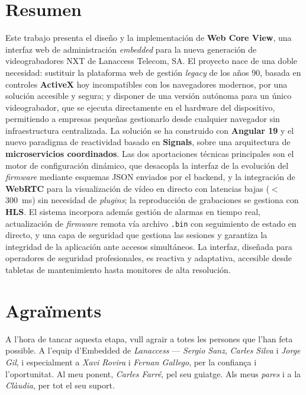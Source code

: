 \documentclass[12pt,a4paper,oneside]{report}
\begin{document}
\chapter*{Resumen}
Este trabajo presenta el diseño y la implementación de \textbf{Web Core View}, una interfaz web de administración \textit{embedded} para la nueva generación de videograbadores NXT de Lanaccess Telecom, SA. El proyecto nace de una doble necesidad: sustituir la plataforma web de gestión \textit{legacy} de los años 90, basada en controles \textbf{ActiveX} hoy incompatibles con los navegadores modernos, por una solución accesible y segura; y disponer de una versión autónoma para un único videograbador, que se ejecuta directamente en el hardware del dispositivo, permitiendo a empresas pequeñas gestionarlo desde cualquier navegador sin infraestructura centralizada. La solución se ha construido con \textbf{Angular 19} y el nuevo paradigma de reactividad basado en \textbf{Signals}, sobre una arquitectura de \textbf{microservicios coordinados}. Las dos aportaciones técnicas principales son el motor de configuración dinámico, que desacopla la interfaz de la evolución del \textit{firmware} mediante esquemas JSON enviados por el backend, y la integración de \textbf{WebRTC} para la visualización de vídeo en directo con latencias bajas ($<$300~ms) sin necesidad de \textit{plugins}; la reproducción de grabaciones se gestiona con \textbf{HLS}. El sistema incorpora además gestión de alarmas en tiempo real, actualización de \textit{firmware} remota vía archivo \texttt{.bin} con seguimiento de estado en directo, y una capa de seguridad que gestiona las sesiones y garantiza la integridad de la aplicación ante accesos simultáneos. La interfaz, diseñada para operadores de seguridad profesionales, es reactiva y adaptativa, accesible desde tabletas de mantenimiento hasta monitores de alta resolución.
\newpage

\chapter*{Agraïments}
A l'hora de tancar aquesta etapa, vull agrair a totes les persones que l'han feta possible. A l'equip d'Embedded de \textit{Lanaccess} --- \textit{Sergio Sanz}, \textit{Carles Silva} i \textit{Jorge Gil}, i especialment a \textit{Xavi Rovira} i \textit{Fernan Gallego}, per la confiança i l'oportunitat. Al meu ponent, \textit{Carles Farré}, pel seu guiatge. Als meus \textit{pares} i a la \textit{Clàudia}, per tot el seu suport.
\newpage

\tableofcontents
\listoftables
\listoffigures

\newpage
{}










\printbibliography[heading=bibintoc, title={Bibliografia}]
\end{document}
